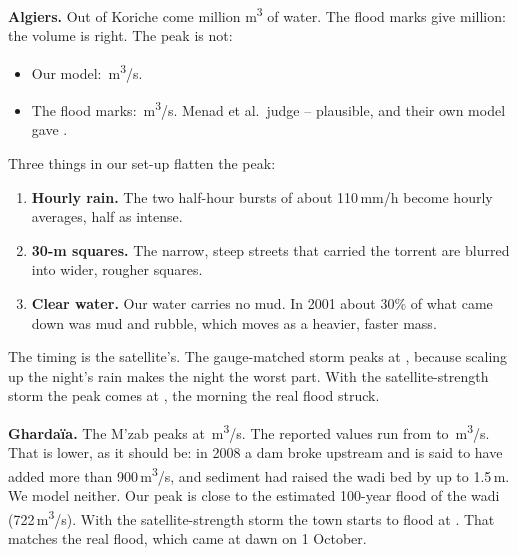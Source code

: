 \textbf{Algiers.} Out of Koriche come \PfiveAlgGTruthVol{} million m\textsuperscript{3} of water. The flood marks give
\PfiveAlgObsVol{} million: the volume is right. The peak is not:
\begin{itemize}
\item Our model: \PfiveAlgGTruthPeak\,m\textsuperscript{3}/s.
\item The flood marks: \PfiveAlgObsPeak\,m\textsuperscript{3}/s. Menad et al.\ judge \PfiveAlgObsLo--\PfiveAlgObsHi{}
plausible, and their own model gave \PfiveAlgObsModel.
\end{itemize}
Three things in our set-up flatten the peak:
\begin{enumerate}
\item \textbf{Hourly rain.} The two half-hour bursts of about 110\,mm/h become hourly averages, half as intense.
\item \textbf{30-m squares.} The narrow, steep streets that carried the torrent are blurred into wider, rougher squares.
\item \textbf{Clear water.} Our water carries no mud. In 2001 about 30\% of what came down was mud and rubble, which
moves as a heavier, faster mass.
\end{enumerate}
The timing is the satellite's. The gauge-matched storm peaks at \PfiveAlgGTruthPeakTime, because scaling up the night's
rain makes the night the worst part. With the satellite-strength storm the peak comes at \PfiveAlgSTruthPeakTime, the
morning the real flood struck.

\textbf{Ghardaïa.} The M'zab peaks at \PfiveGhaGTruthPeak\,m\textsuperscript{3}/s. The reported values run from
\PfiveGhaObsLo{} to \PfiveGhaObsHi\,m\textsuperscript{3}/s. That is lower, as it should be: in 2008 a dam broke upstream
and is said to have added more than 900\,m\textsuperscript{3}/s, and sediment had raised the wadi bed by up to 1.5\,m. We
model neither. Our peak is close to the estimated 100-year flood of the wadi (722\,m\textsuperscript{3}/s). With the
satellite-strength storm the town starts to flood at \PfiveGhaSTruthFlood{}. That matches the real flood, which came at
dawn on 1 October.

